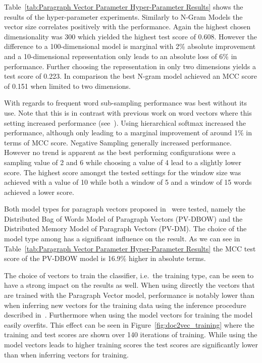 Table~\ref{tab:Paragraph Vector Parameter Hyper-Parameter Results} shows the results of the hyper-parameter experiments. Similarly to N-Gram Models the vector size correlates positively with the performance. Again the highest chosen dimensionality was 300 which yielded the highest test score of 0.608. However the difference to a 100-dimensional model is marginal with 2\% absolute improvement and a 10-dimensional representation only leads to an absolute loss of 6\% in performance. Further choosing the representation in only two dimensions yields a test score of 0.223. In comparison the best N-gram model achieved an \gls{MCC} score of 0.151 when limited to two dimensions.

With regards to frequent word sub-sampling performance was best without its use. Note that this is in contrast with previous work on word vectors where this setting increased performance (see~\cite{Mikolov:2013ab}). Using hierarchical softmax increased the performance, although only leading to a marginal improvement of around 1\% in terms of MCC score. Negative Sampling generally increased performance. However no trend is apparent as the best performing configurations were a sampling value of 2 and 6 while choosing a value of 4 lead to a slightly lower score. The highest score amongst the tested settings for the window size was achieved with a value of 10 while both a window of 5 and a window of 15 words achieved a lower score.

Both model types for paragraph vectors proposed in~\cite{Le:2014aa} were tested, namely the Distributed Bag of Words Model of Paragraph Vectors (PV-DBOW) and the Distributed Memory Model of Paragraph Vectors (PV-DM). The choice of the model type among has a significant influence on the result. As we can see in Table~\ref{tab:Paragraph Vector Parameter Hyper-Parameter Results} the \gls{MCC} test score of the PV-DBOW model is 16.9\% higher in absolute terms.

The choice of vectors to train the classifier, i.e.\ the training type, can be seen to have a strong impact on the results as well. When using directly the vectors that are trained with the Paragraph Vector model, performance is notably lower than when inferring new vectors for the training data using the inference procedure described in~\cite{Le:2014aa}. Furthermore when using the model vectors for training the model easily overfits. This effect can be seen in Figure~\ref{fig:doc2vec_training} where the training and test scores are shown over 140 iterations of training. While using the model vectors leads to higher training scores the test scores are significantly lower than when inferring vectors for training.

